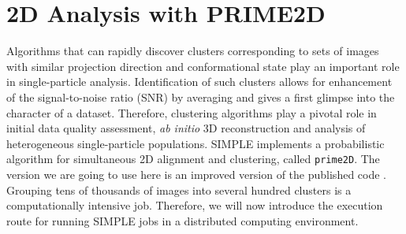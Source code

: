 \documentclass[a4paper,11pt]{article}
\newcommand{\prgname}[1]{\textcolor{NavyBlue}{\texttt{#1}}}
\begin{document}
\section{2D Analysis with PRIME2D}
Algorithms that can rapidly discover clusters corresponding to sets of images with similar projection direction and conformational state play an important role in single-particle analysis. Identification of such clusters allows for enhancement of the signal-to-noise ratio (SNR) by averaging and gives a first glimpse into the character of a dataset. Therefore, clustering algorithms play a pivotal role in initial data quality assessment, \textit{ab initio} 3D reconstruction and analysis of heterogeneous single-particle populations. SIMPLE implements a probabilistic algorithm for simultaneous 2D alignment and clustering, called \prgname{prime2D}. The version we are going to use here is an improved version of the published code \citep{reboul2016stochastic}. Grouping tens of thousands of images into several hundred clusters is a computationally intensive job. Therefore, we will now introduce the execution route for running SIMPLE jobs in a distributed computing environment.
\end{document}
